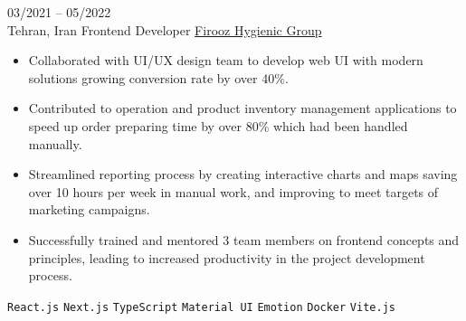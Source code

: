 \entry
{03/2021 -- 05/2022 \\ Tehran, Iran}
{Frontend Developer}
{\href{https://firoozshop.com/}{Firooz Hygienic Group}}
{\vspace{-10pt}
    \begin{itemize}[noitemsep,topsep=0pt,parsep=0pt,partopsep=0pt, leftmargin=-1pt]
        \item Collaborated with UI/UX design team to develop web UI with modern solutions growing conversion rate by over 40\%.
        \item Contributed to operation and product inventory management applications to speed up order preparing time by over 80\% which had been handled manually.
        \item Streamlined reporting process by creating interactive charts and maps saving over 10 hours per week in manual work, and improving to meet targets of marketing campaigns.
        \item Successfully trained and mentored 3 team members on frontend concepts and principles, leading to increased productivity in the project development process.
    \end{itemize}
    \texttt{React.js} \slashsep \texttt{Next.js} \slashsep \texttt{TypeScript} \slashsep \texttt{Material UI} \slashsep \texttt{Emotion} \slashsep \texttt{Docker} \slashsep \texttt{Vite.js}
}
